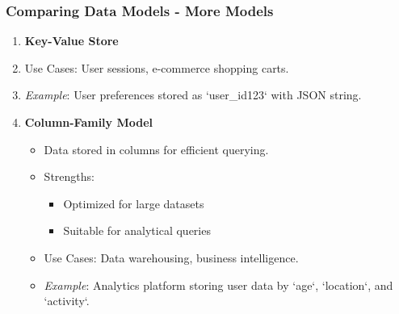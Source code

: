 \documentclass[aspectratio=169]{beamer}
\begin{document}
\begin{frame}[fragile]
    \frametitle{Comparing Data Models - More Models}
    \begin{enumerate}[resume]
        \item \textbf{Key-Value Store}
                \item Use Cases: User sessions, e-commerce shopping carts.
                \item \textit{Example}: User preferences stored as `user_id123` with JSON string.

        \item \textbf{Column-Family Model}
            \begin{itemize}
                \item Data stored in columns for efficient querying.
                \item Strengths:
                    \begin{itemize}
                        \item Optimized for large datasets
                        \item Suitable for analytical queries
                    \end{itemize}
                \item Use Cases: Data warehousing, business intelligence.
                \item \textit{Example}: Analytics platform storing user data by `age`, `location`, and `activity`.
            \end{itemize}
    \end{enumerate}
\end{frame}
\end{document}

